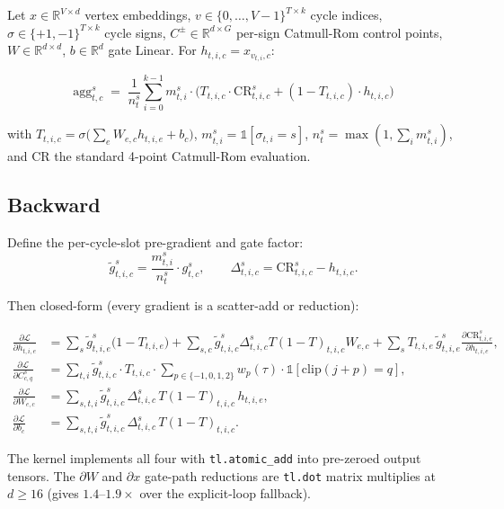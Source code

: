 \documentclass[11pt,a4paper]{article}
\begin{document}
Let $x \in \mathbb{R}^{V \times d}$ vertex embeddings,
$v \in \{0,\dots,V{-}1\}^{T \times k}$ cycle indices,
$\sigma \in \{+1,-1\}^{T \times k}$ cycle signs,
$C^{\pm} \in \mathbb{R}^{d \times G}$ per-sign Catmull-Rom control
points, $W \in \mathbb{R}^{d \times d}$, $b \in \mathbb{R}^{d}$ gate
Linear. For $h_{t,i,c} = x_{v_{t,i},c}$:

\[
\boxed{\;
\mathrm{agg}^{s}_{t,c}
\;=\;
\frac{1}{n^{s}_{t}} \sum_{i=0}^{k-1} m^{s}_{t,i} \cdot
\big( T_{t,i,c} \cdot \mathrm{CR}^{s}_{t,i,c} + (1 - T_{t,i,c}) \cdot h_{t,i,c} \big)
\;}
\]

with $T_{t,i,c} = \sigma\!\big(\sum_e W_{e,c} h_{t,i,e} + b_c\big)$,
$m^{s}_{t,i} = \mathbb{1}[\sigma_{t,i} = s]$, $n^{s}_{t} = \max(1, \sum_i m^{s}_{t,i})$,
and $\mathrm{CR}$ the standard 4-point Catmull-Rom evaluation.

\subsection*{Backward}

Define the per-cycle-slot pre-gradient and gate factor:
\[
\tilde g^{s}_{t,i,c} = \frac{m^{s}_{t,i}}{n^{s}_{t}} \cdot g^{s}_{t,c},
\qquad
\Delta^{s}_{t,i,c} = \mathrm{CR}^{s}_{t,i,c} - h_{t,i,c}.
\]

Then closed-form (every gradient is a scatter-add or reduction):

\begin{align*}
\frac{\partial \mathcal{L}}{\partial h_{t,i,e}}
&= \sum_{s} \tilde g^{s}_{t,i,e}\big(1{-}T_{t,i,e}\big)
 + \sum_{s,c} \tilde g^{s}_{t,i,c} \Delta^{s}_{t,i,c} T(1{-}T)_{t,i,c} W_{e,c}
 + \sum_{s} T_{t,i,e}\,\tilde g^{s}_{t,i,e} \frac{\partial \mathrm{CR}^{s}_{t,i,e}}{\partial h_{t,i,e}}, \\
\frac{\partial \mathcal{L}}{\partial C^{s}_{c, q}}
&= \sum_{t,i} \tilde g^{s}_{t,i,c} \cdot T_{t,i,c} \cdot \!\!\!\sum_{p \in \{-1,0,1,2\}} w_p(\tau) \cdot \mathbb{1}[\mathrm{clip}(j+p)=q], \\
\frac{\partial \mathcal{L}}{\partial W_{e,c}}
&= \sum_{s,t,i} \tilde g^{s}_{t,i,c}\,\Delta^{s}_{t,i,c}\,T(1{-}T)_{t,i,c}\,h_{t,i,e}, \\
\frac{\partial \mathcal{L}}{\partial b_{c}}
&= \sum_{s,t,i} \tilde g^{s}_{t,i,c}\,\Delta^{s}_{t,i,c}\,T(1{-}T)_{t,i,c}.
\end{align*}

The kernel implements all four with \texttt{tl.atomic\_add} into
pre-zeroed output tensors. The $\partial W$ and $\partial x$
gate-path reductions are \texttt{tl.dot} matrix multiplies at
$d \ge 16$ (gives $1.4$--$1.9\times$ over the explicit-loop fallback).
\end{document}
